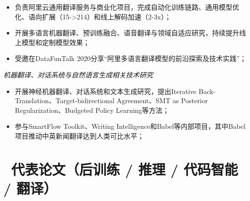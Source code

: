 \documentclass{resume}
\begin{document}
\begin{itemize}
  \item 负责阿里云通用翻译服务与商业化项目，完成自动化训练链路、通用模型优化、语向扩展（15->214）和线上解码加速（2-3x）；
  \item 开展多语言机器翻译、预训练融合、语音翻译与领域自适应研究，持续提升线上模型和定制模型效果；
  \item 受邀在DataFunTalk 2020分享“阿里多语言翻译模型的前沿探索及技术实践”；
\end{itemize}

\textit{机器翻译、对话系统与自然语言生成相关技术研究}
\begin{itemize}
  \item 开展神经机器翻译、对话系统和文本生成研究，提出Iterative Back-Translation、Target-bidirectional Agreement、SMT as Posterior Regularization、Budgeted Policy Learning等方法；
  \item 参与SmartFlow Toolkit、Writing Intelligence和Babel等内部项目，其中Babel项目推动中英新闻翻译达到人类可比水平；
\end{itemize}

\section{\faFilesO\ 代表论文（后训练 / 推理 / 代码智能 / 翻译）}
\end{document}
